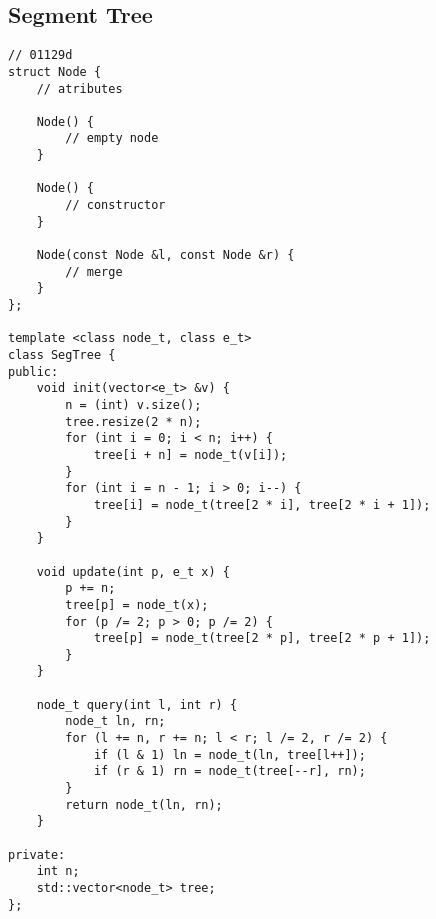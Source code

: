 \documentclass[12pt, a4paper, twoside]{article}
\begin{document}
\subsection{Segment Tree
}
\begin{lstlisting}
// 01129d
struct Node {
	// atributes

	Node() {
		// empty node
	}

	Node() {
		// constructor
	}
 
	Node(const Node &l, const Node &r) {
		// merge
	}
};

template <class node_t, class e_t>
class SegTree {
public:
	void init(vector<e_t> &v) {
		n = (int) v.size();
		tree.resize(2 * n);
		for (int i = 0; i < n; i++) {
			tree[i + n] = node_t(v[i]);
		}
		for (int i = n - 1; i > 0; i--) {
			tree[i] = node_t(tree[2 * i], tree[2 * i + 1]);
		}
	}

	void update(int p, e_t x) {
		p += n;
		tree[p] = node_t(x);
		for (p /= 2; p > 0; p /= 2) {
			tree[p] = node_t(tree[2 * p], tree[2 * p + 1]);
		}
	}

	node_t query(int l, int r) {
		node_t ln, rn;
		for (l += n, r += n; l < r; l /= 2, r /= 2) {
			if (l & 1) ln = node_t(ln, tree[l++]);
			if (r & 1) rn = node_t(tree[--r], rn);
		}
		return node_t(ln, rn);
	}

private:
	int n;
	std::vector<node_t> tree;
};
\end{lstlisting}
\end{document}
